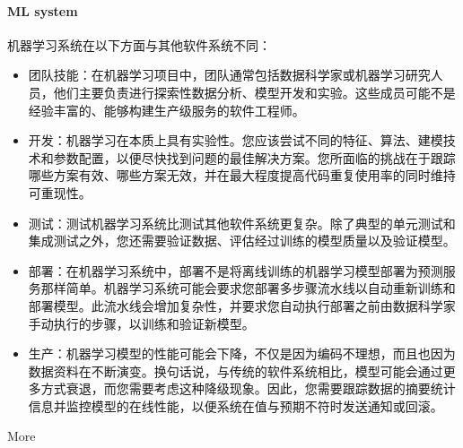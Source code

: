 \documentclass[letterpaper,10pt,english]{sphinxmanual}
\begin{document}
\paragraph{ML system}
\label{\detokenize{chapter_AI_dive/ML:ml-system}}
机器学习系统在以下方面与其他软件系统不同：%
\begin{footnote}[939]\sphinxAtStartFootnote
{}
%
\end{footnote}
\begin{itemize}
\item {} 
团队技能：在机器学习项目中，团队通常包括数据科学家或机器学习研究人员，他们主要负责进行探索性数据分析、模型开发和实验。这些成员可能不是经验丰富的、能够构建生产级服务的软件工程师。

\item {} 
开发：机器学习在本质上具有实验性。您应该尝试不同的特征、算法、建模技术和参数配置，以便尽快找到问题的最佳解决方案。您所面临的挑战在于跟踪哪些方案有效、哪些方案无效，并在最大程度提高代码重复使用率的同时维持可重现性。

\item {} 
测试：测试机器学习系统比测试其他软件系统更复杂。除了典型的单元测试和集成测试之外，您还需要验证数据、评估经过训练的模型质量以及验证模型。

\item {} 
部署：在机器学习系统中，部署不是将离线训练的机器学习模型部署为预测服务那样简单。机器学习系统可能会要求您部署多步骤流水线以自动重新训练和部署模型。此流水线会增加复杂性，并要求您自动执行部署之前由数据科学家手动执行的步骤，以训练和验证新模型。

\item {} 
生产：机器学习模型的性能可能会下降，不仅是因为编码不理想，而且也因为数据资料在不断演变。换句话说，与传统的软件系统相比，模型可能会通过更多方式衰退，而您需要考虑这种降级现象。因此，您需要跟踪数据的摘要统计信息并监控模型的在线性能，以便系统在值与预期不符时发送通知或回滚。

\end{itemize}

More%
\begin{footnote}[940]\sphinxAtStartFootnote
{}
%
\end{footnote}
\end{document}
